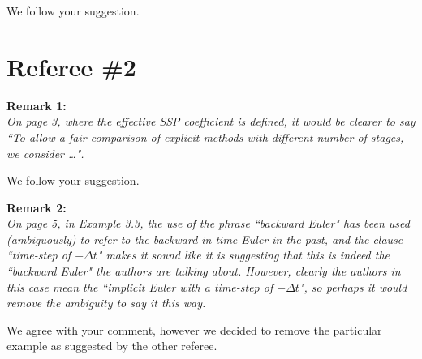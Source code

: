 \documentclass[12pt]{article}
\newcommand{\remark}[2]{\vspace{25pt} \noindent \textbf{Remark #1:\newline} \textit{#2}\vspace{15pt}}
\renewcommand{\newline}{\vspace{15pt}\\}
\begin{document}
We follow your suggestion.
\vspace{50pt}

\section*{Referee \#2}
\remark{1}{
On page 3, where the effective SSP coefficient is defined, it would be clearer to say
``To allow a fair comparison of explicit methods with different number of stages, we consider \dots". }

We follow your suggestion.

\remark{2}{
On page 5, in Example 3.3, the use of the phrase ``backward Euler" has been used 
(ambiguously) to refer to the backward-in-time Euler in the past, and the clause 
``time-step of $-\Delta t$" makes it sound like it is suggesting that this is indeed 
the ``backward Euler" the authors are talking about. 
However, clearly the authors in this case mean the ``implicit Euler with a time-step 
of $-\Delta t$", so perhaps it would remove the ambiguity to say it this way.}

We agree with your comment, however we decided to remove the particular example 
as suggested by the other referee.
\end{document}
